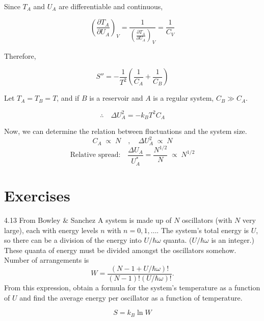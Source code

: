 Since $T_A$ and $U_A$ are differentiable and continuous,

\begin{equation}
    \left(\frac{\partial T_A}{\partial U_A}\right)_V = \frac{1}{\left(\frac{\partial T_A}{\partial U_A}\right)_V}=\frac{1}{C_V}
\end{equation}

Therefore,

\begin{equation}
    S''=-\frac{1}{T^2}\left(\frac{1}{C_A}+\frac{1}{C_B} \right)
\end{equation}

Let $T_A = T_B =T$, and if $B$ is a reservoir and $A$ is a regular system, $C_B\gg C_A$.

\begin{equation}
    \therefore \quad \Delta U_A^2 = -k_B T^2 C_A
\end{equation}

Now, we can determine the relation between fluctuations and the system size.
\begin{equation}
    C_A \;\propto\; N \quad, \quad \Delta U_A^2 \;\propto\; N
\end{equation}
\begin{equation}
    \textrm{Relative spread:}\quad \frac{\Delta U_A}{U_A^*} = \frac{N^{1/2}}{N} \;\propto\; N^{1/2}
\end{equation}
\section{Exercises}
\begin{eocproblem*}{4.13 From Bowley \& Sanchez}
    {
    A system is made up of \(N\) oscillators (with \(N\) very large), each with energy levels \(n\) with \(n = 0, 1, \ldots\). The system’s total energy is \(U\), so there can be a division of the energy into \(U/\hbar\omega\) quanta. (\(U/\hbar\omega\) is an integer.) These quanta of energy must be divided amongst the oscillators somehow. Number of arrangements is
\begin{equation*}
W = \frac{(N - 1 + U/\hbar\omega)!}{(N - 1)!(U/\hbar\omega)!}.
\end{equation*}
From this expression, obtain a formula for the system’s temperature as a function of \(U\) and find the average energy per oscillator as a function of temperature.}
\end{eocproblem*}

\begin{equation}
    S = k_B \ln W
\end{equation}

